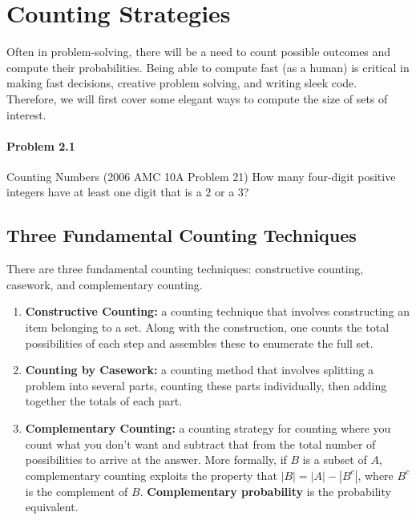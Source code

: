 \documentclass{article}
\begin{document}
\section{Counting Strategies}

Often in problem-solving, there will be a need to count possible outcomes and compute their probabilities. Being able to compute fast (as a human) is critical in making fast decisions, creative problem solving, and writing sleek code. Therefore, we will first cover some elegant ways to compute the size of sets of interest.

\paragraph{Problem 2.1} Counting Numbers (2006 AMC 10A Problem 21)
\newline
\newline
How many four-digit positive integers have at least one digit that is a $2$ or a $3$?
\newline
\newline
\newline
\subsection{Three Fundamental Counting Techniques}
\newline
There are three fundamental counting techniques: constructive counting, casework, and complementary counting.
\newline \begin{enumerate}

\item{\textbf{Constructive Counting:} a counting technique that involves constructing an item belonging to a set. Along with the construction, one counts the total possibilities of each step and assembles these to enumerate the full set.}

\item{\textbf{Counting by Casework:} a counting method that involves splitting a problem into several parts, counting these parts individually, then adding together the totals of each part.}

\item{\textbf{Complementary Counting:} a counting strategy for counting where you count what you don't want and subtract that from the total number of possibilities to arrive at the answer. More formally, if $B$ is a subset of $A$, complementary counting exploits the property that $|B| = |A| - |B^c|$, where $B^c$ is the complement of $B$. \textbf{Complementary probability} is the probability equivalent.}

\end{enumerate}
\newline
\newline
\end{document}
